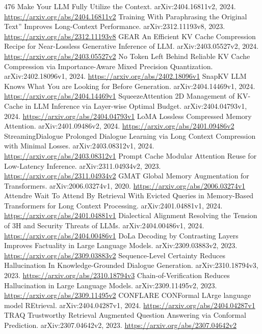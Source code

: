 \documentclass[11pt]{article}
\begin{document}
\begin{thebibliography}{476}
 Make Your LLM Fully Utilize the Context. arXiv:2404.16811v2, 2024. \url{https://arxiv.org/abs/2404.16811v2}
 Training With Paraphrasing the Original Text'' Improves Long-Context Performance. arXiv:2312.11193v8, 2023. \url{https://arxiv.org/abs/2312.11193v8}
 GEAR An Efficient KV Cache Compression Recipe for Near-Lossless Generative Inference of LLM. arXiv:2403.05527v2, 2024. \url{https://arxiv.org/abs/2403.05527v2}
 No Token Left Behind Reliable KV Cache Compression via Importance-Aware Mixed Precision Quantization. arXiv:2402.18096v1, 2024. \url{https://arxiv.org/abs/2402.18096v1}
 SnapKV LLM Knows What You are Looking for Before Generation. arXiv:2404.14469v1, 2024. \url{https://arxiv.org/abs/2404.14469v1}
 SqueezeAttention 2D Management of KV-Cache in LLM Inference via Layer-wise Optimal Budget. arXiv:2404.04793v1, 2024. \url{https://arxiv.org/abs/2404.04793v1}
 LoMA Lossless Compressed Memory Attention. arXiv:2401.09486v2, 2024. \url{https://arxiv.org/abs/2401.09486v2}
 StreamingDialogue Prolonged Dialogue Learning via Long Context Compression with Minimal Losses. arXiv:2403.08312v1, 2024. \url{https://arxiv.org/abs/2403.08312v1}
 Prompt Cache Modular Attention Reuse for Low-Latency Inference. arXiv:2311.04934v2, 2023. \url{https://arxiv.org/abs/2311.04934v2}
 GMAT Global Memory Augmentation for Transformers. arXiv:2006.03274v1, 2020. \url{https://arxiv.org/abs/2006.03274v1}
 Attendre Wait To Attend By Retrieval With Evicted Queries in Memory-Based Transformers for Long Context Processing. arXiv:2401.04881v1, 2024. \url{https://arxiv.org/abs/2401.04881v1}
 Dialectical Alignment Resolving the Tension of 3H and Security Threats of LLMs. arXiv:2404.00486v1, 2024. \url{https://arxiv.org/abs/2404.00486v1}
 DoLa Decoding by Contrasting Layers Improves Factuality in Large Language Models. arXiv:2309.03883v2, 2023. \url{https://arxiv.org/abs/2309.03883v2}
 Sequence-Level Certainty Reduces Hallucination In Knowledge-Grounded Dialogue Generation. arXiv:2310.18794v3, 2023. \url{https://arxiv.org/abs/2310.18794v3}
 Chain-of-Verification Reduces Hallucination in Large Language Models. arXiv:2309.11495v2, 2023. \url{https://arxiv.org/abs/2309.11495v2}
 CONFLARE CONFormal LArge language model REtrieval. arXiv:2404.04287v1, 2024. \url{https://arxiv.org/abs/2404.04287v1}
 TRAQ Trustworthy Retrieval Augmented Question Answering via Conformal Prediction. arXiv:2307.04642v2, 2023. \url{https://arxiv.org/abs/2307.04642v2}

\end{thebibliography}
\end{document}
